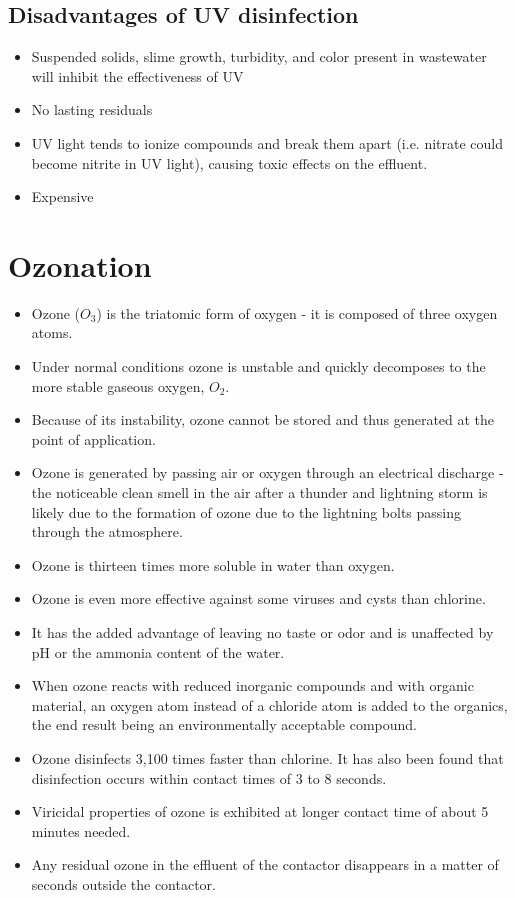 \subsection{Disadvantages of UV disinfection}
\begin{itemize}
	\item Suspended solids, slime growth, turbidity, and color present in wastewater will inhibit the effectiveness of UV
	\item No lasting residuals
	\item UV light tends to ionize compounds and break them apart (i.e. nitrate could become nitrite in UV light), causing toxic effects on the effluent.
	\item Expensive
\end{itemize}

\section{Ozonation}
		\begin{itemize}
			\item Ozone ($O_3$) is the triatomic form of oxygen - it is composed of three oxygen atoms.
			\item Under normal conditions ozone is unstable and quickly decomposes to the more stable gaseous oxygen, $O_2$. 
			\item Because of its instability, ozone cannot be stored and thus generated at the point of application. 
			\item Ozone is generated by passing air or oxygen through an electrical discharge - the noticeable clean smell in the air after a thunder and lightning storm is likely due to the formation of ozone due to the lightning bolts passing through the atmosphere.
			\item Ozone is thirteen times more soluble in water than oxygen. 
			\item Ozone is even more effective against some viruses and cysts than chlorine.
			\item It has the added advantage of leaving no taste or odor and is unaffected by pH or the ammonia content of the water. 
			\item When ozone reacts with reduced inorganic compounds and with organic material, an oxygen atom instead of a chloride atom is added to the organics, the end result being an environmentally acceptable compound.
			\item Ozone disinfects 3,100 times faster than chlorine. It has also been found that disinfection occurs within contact times of 3 to 8 seconds.
			\item Viricidal properties of ozone is exhibited at longer contact time of about 5 minutes needed.
			\item Any residual ozone in the effluent of the contactor disappears in a matter of seconds outside the contactor.
		\end{itemize}

